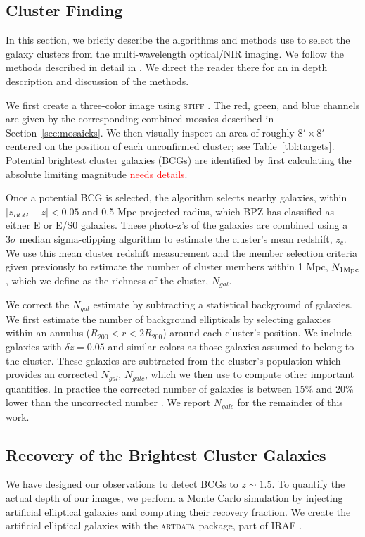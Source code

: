 \documentclass[apj, revtex4]{emulateapj}
\newcommand{\editorial}[1]{\textcolor{red}{#1}}
\begin{document}
\subsection{Cluster Finding}
In this section, we briefly describe the algorithms and methods use to select the galaxy clusters from the multi-wavelength optical/NIR imaging. We follow the methods described in detail in \cite{Menanteau2009a, Menanteau2010}. We direct the reader there for an in depth description and discussion of the methods.  

We first create a three-color image using \textsc{stiff} \citep{Bertin2011}. The red, green, and blue channels are given by the corresponding combined mosaics described in Section~\ref{sec:mosaicks}. We then visually inspect an area of roughly $8' \times 8'$ centered on the position of each unconfirmed cluster; see Table~\ref{tbl:targets}. Potential brightest cluster galaxies (BCGs) are identified by first calculating the absolute limiting magnitude \editorial{needs details}.

Once a potential BCG is selected, the algorithm selects nearby galaxies, within $|z_{BCG} - z| < 0.05$ and 0.5 Mpc projected radius, which BPZ has classified as either E or E/S0 galaxies. These photo-z's of the galaxies are combined using a $3\sigma$ median sigma-clipping algorithm to estimate the cluster's mean redshift, $z_c$. We use this mean cluster redshift measurement and the member selection criteria given previously to estimate the number of cluster members within 1 Mpc, $N_{1\rm Mpc}$, which we define as the richness of the cluster, $N_{gal}$.   

We correct the $N_{gal}$ estimate by subtracting a statistical background of galaxies. We first estimate the number of background ellipticals by selecting galaxies within an annulus ($R_{200} <r < 2R_{200}$) around each cluster's position. We include galaxies with $\delta z = 0.05$ and similar colors as those galaxies assumed to belong to the cluster. These galaxies are subtracted from the cluster's population which provides an corrected $N_{gal}$, $N_{galc}$, which we then use to compute other important quantities. In practice the corrected number of galaxies is between 15\% and 20\% lower than the uncorrected number \citep{Menanteau2010}. We report $N_{galc}$ for the remainder of this work.

\subsection{Recovery of the Brightest Cluster Galaxies}
We have designed our observations to detect BCGs to $z\sim1.5$. To quantify the actual depth of our images, we perform a Monte Carlo simulation by injecting artificial elliptical galaxies and computing their recovery fraction. We create the artificial elliptical galaxies with the \textsc{artdata} package, part of \textsc{IRAF} \citep{Tody1993}.
\end{document}

